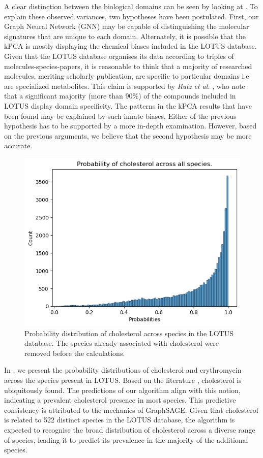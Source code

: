 \documentclass[
11pt, %
oneside, %
english, %
singlespacing, %
headsepline, %
chapterinoneline, %
]{MastersDoctoralThesis} %
\begin{document}
A clear distinction between the biological domains can be seen by looking at . To explain these observed variances, two hypotheses have been postulated. First, our  Graph Neural Network (GNN) may be capable of distinguishing the molecular signatures that are unique to each domain. Alternately, it is possible that the kPCA is mostly displaying the chemical biases included in the LOTUS database. Given that the LOTUS database organises its data according to triples of molecules-species-papers, it is reasonable to think that a majority of  researched molecules, meriting scholarly publication, are specific to particular domains i.e are specialized metabolites. This claim is supported by \textit{Rutz et al.} \cite{rutzLOTUSInitiativeOpen2022}, who note that a significant majority (more than 90\%) of the compounds included in LOTUS display domain specificity. The patterns in the kPCA results that have been found may be explained by such innate biases. Either of the previous hypothesis has to be supported by a more in-depth examination. However, based on the previous arguments, we believe that the second hypothesis may be more accurate.
 
\begin{figure}[h]
	\centering
	\includegraphics[scale=0.7]{figure/cholesterol}
	\caption{Probability distribution of cholesterol across species in the LOTUS database. The species already associated with cholesterol were removed before the calculations.}
	\label{fig: hist cholesterol}
\end{figure}

In , we present the probability distributions of cholesterol and erythromycin across the species present in LOTUS. Based on the literature \cite{o2013merck, international1979iarc}, cholesterol is ubiquitously found. The predictions of our algorithm align with this notion, indicating a prevalent cholesterol presence in most species. This predictive consistency is attributed to the mechanics of GraphSAGE. Given that cholesterol is related to 522 distinct species in the LOTUS database, the algorithm is expected to recognise the broad distribution of cholesterol across a diverse range of species, leading it to predict its prevalence in the majority of the additional species.
\end{document}
